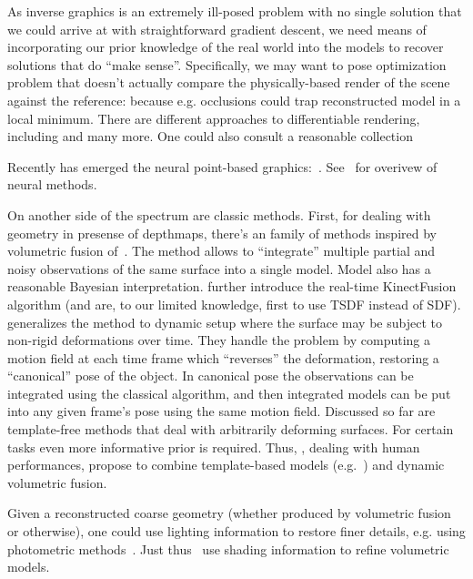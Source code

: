 As inverse graphics is an extremely ill-posed problem with no single solution
that we could arrive at with straightforward gradient descent, we need means of
incorporating our prior knowledge of the real world into the models to recover
solutions that do ``make sense''. Specifically, we may want to pose
optimization problem that doesn't actually compare the physically-based render
of the scene against the reference: because e.g. occlusions could trap
reconstructed model in a local minimum. There are different approaches to
differentiable rendering, including \citet{softras,dibR} and many more.
One could also consult a reasonable collection~\cite{kaolin}

Recently has emerged the neural point-based graphics:~\citet{npbg}.
See~\citet{neuralRenderingOverview} for overivew of neural methods.

On another side of the spectrum are classic methods. First, for dealing with
geometry in presense of depthmaps, there's an family of methods inspired by
volumetric fusion of~\citet{sdfFusion}. The method allows to ``integrate''
multiple partial and noisy observations of the same surface into a single
model.  Model also has a reasonable Bayesian interpretation.
\citet{kinectfusion} further introduce the real-time KinectFusion algorithm
(and are, to our limited knowledge, first to use TSDF instead of SDF).
\citet{dynamicfusion} generalizes the method to dynamic setup
where the surface may be subject to non-rigid deformations over time.
They handle the problem by computing a motion field at each time frame
which ``reverses'' the deformation, restoring a ``canonical'' pose
of the object. In canonical pose the observations can be integrated using
the classical algorithm, and then integrated models can be put into
any given frame's pose using the same motion field.
Discussed so far are template-free methods that deal with arbitrarily deforming
surfaces. For certain tasks even more informative prior is required.
Thus, \citet{doublefusion}, dealing with human performances, propose to combine
template-based models (e.g.~\citet{smpl,softsmpl}) and dynamic volumetric
fusion.

Given a reconstructed coarse geometry (whether produced by volumetric fusion or
otherwise), one could use lighting information to restore finer details, e.g.
using photometric methods~\citet{flashmob}. Just thus~\citet{shadingRefinedSDF}
use shading information to refine volumetric models.

